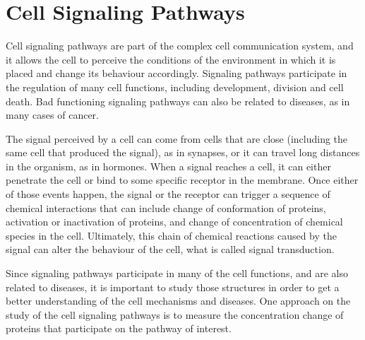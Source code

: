 
\section{Cell Signaling Pathways}
Cell signaling pathways are part of the complex cell communication 
system, and it allows the cell to perceive the conditions of the 
environment in which it is placed and change its behaviour accordingly.
Signaling pathways participate in the regulation of many cell functions,
including development, division and cell death. Bad functioning 
signaling pathways can also be related to diseases, as in many cases of
cancer.

The signal perceived by a cell can come from cells that are close 
(including the same cell that produced the signal), as in synapses, or 
it can travel long distances in the organism, as in hormones. When a 
signal reaches a cell, it can either penetrate the cell or bind to some 
specific receptor in the membrane. Once either of those events happen, 
the signal or the receptor can trigger a sequence of chemical 
interactions that can include change of conformation of proteins, 
activation or inactivation of proteins, and change of concentration of
chemical species in the cell. Ultimately, this chain of chemical 
reactions caused by the signal can alter the behaviour of the cell, what 
is called signal transduction.

Since signaling pathways participate in many of the cell functions, and 
are also related to diseases, it is important to study those structures
in order to get a better understanding of the cell mechanisms and 
diseases. One approach on the study of the cell signaling pathways is to 
measure the concentration change of proteins that participate on the 
pathway of interest.

